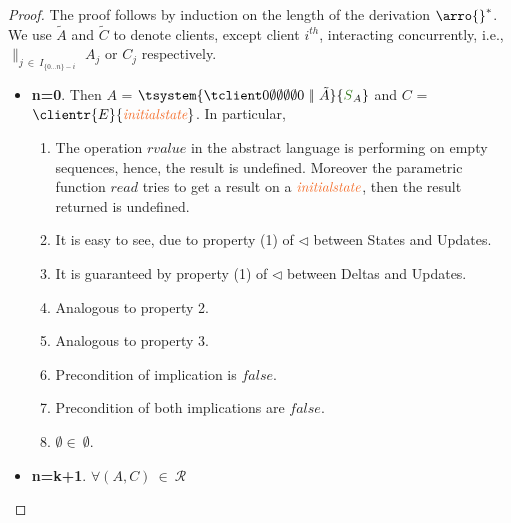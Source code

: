 \documentclass[envcountsect,runningheads,orivec]{llncs}
\begin{document}
\begin{proof}

The proof follows by induction on the length of the derivation $\arro{} ^*$. We use $\tilde{A}$ and $\tilde{C}$ to denote clients, except client $i^{th}$, interacting concurrently, i.e., $\parallel_{j \ \in\ I_{\{0 \ldots n\} - i}}$ $A_j$ or $C_j$ respectively.

\begin{itemize}
   \item{\bf n=0}. Then $A$ = $\tsystem{\tclienti{0}{\emptyset}{\emptyset}{\emptyset}{\emptyset}{0}\ \bigpar\ \tilde{A}}{\queuemessage_A}$ and $C$ = $\clientr{E}{\initialstate}$. In particular,

			\begin{enumerate}
				\item The operation $rvalue$ in the abstract language is performing on empty sequences, hence, the result is undefined. Moreover the parametric function $read$ tries to get a result on a $\initialstate$, then the result returned is undefined.
				\item It is easy to see, due to property (1) of $\triangleleft$ between States and Updates.
				\item It is guaranteed by property (1) of $\triangleleft$ between Deltas and Updates.
				\item Analogous to property 2.
				\item Analogous to property 3.
				\item Precondition of implication is $false$.
				\item Precondition of both implications are $false$. 
				\item $\emptyset \in \ \emptyset$.
				
			\end{enumerate}
	
   \item{\bf n=k+1}. $\forall (A,C) \ \in \ \mathcal{R}$
	

\end{itemize}
\end{proof}
\end{document}
